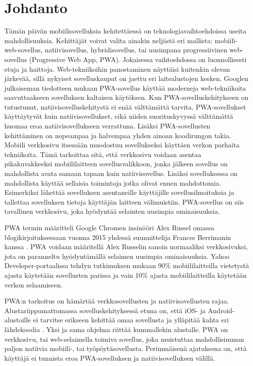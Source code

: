 \documentclass{tktltiki}
\begin{document}
\mytableofcontents

\section{Johdanto}

Tämän päivän mobiilisovelluksia kehitettäessä on teknologiavaihtoehdoissa useita mahdollisuuksia. Kehittäjät voivat valita ainakin neljästä eri mallista: mobiili-web-sovellus, natiivisovellus, hybridisovellus, tai uusimpana progressiivinen web-sovellus (Progressive Web App, PWA). Jokaisessa vaihtoehdossa on luonnollisesti etuja ja haittoja. Web-tekniikoihin panostaminen näyttäisi kuitenkin olevan järkevää, sillä nykyiset sovelluskaupat on jaettu eri laitealustojen kesken. Googlen julkaiseman tiedotteen mukaan \cite{Gambhir} PWA-sovellus käyttää moderneja web-tekniikoita saavuttaakseen sovelluksen kaltaisen käytöksen. Kun PWA-sovelluskehitykseen on tutustunut, natiivisovelluskehitystä ei enää välttämättä tarvita. PWA-sovellukset käyttäytyvät kuin natiivisovellukset, eikä niiden suorituskyvyssä välttämättä huomaa eroa natiivisovellukseen verrattuna. Lisäksi PWA-sovellusten kehittäminen on nopeampaa ja halvempaa yhden ainoan koodirungon takia. Mobiili verkkosivu itsessään muodostuu sovellukseksi käyttäen verkon parhaita tekniikoita. Tämä tarkoittaa sitä, että verkkosivu voidaan asentaa pikakuvakkeeksi mobiililaitteen sovellusvalikkoon, jonka jälkeen sovellus on mahdollista avata samaan tapaan kuin natiivisovellus. Lisäksi sovelluksessa on mahdollista käyttää sellaisia toimintoja jotka olivat ennen mahdottomia. Esimerkiksi lähettää sovelluksen asentaneille käyttäjille sovellusilmoituksia ja tallettaa sovelluksen tietoja käyttäjän laitteen välimuistiin. PWA-sovellus on siis tavallinen verkkosivu, joka hyödyntää selainten uusimpia ominaisuuksia.

PWA termin määritteli Google Chromen insinööri Alex Russel \cite{Russell, biorn2017progressive} omassa blogikirjoituksessaan vuonna 2015 yhdessä suunnittelija Frances Berrimanin kanssa \cite{tandelimpact}. PWA voidaan määritellä Alex Russelin sanoin normaaliksi verkkosivuksi, jota on paranneltu hyödyntämällä selaimen uusimpia ominaisuuksia. Yahoo Developer-portaalissa tehdyn tutkimuksen mukaan \cite{Khalaf} 90\% mobiililaitteilla vietetystä ajasta käytetään sovellusten parissa ja vain 10\% ajasta mobiililaitteilla käytetään verkon selaamiseen. 

PWA:n tarkoitus on hämärtää verkkosovellusten ja natiivisovellusten rajaa. Alustariippumattomassa sovelluskehityksessä etuna on, että iOS- ja Android-alustoille ei tarvitse erikseen kehittää omaa sovellusta ja ylläpitää kahta eri lähdekoodia \cite{xanthopoulos2013comparative}. Yksi ja sama ohjelma riittää kummallekin alustalle. PWA on verkkosivu, tai web-selaimella toimiva sovellus, joka muistuttaa mahdollisimman paljon natiivia mobiili-, tai työpöytäsovellusta. Perimmäisenä ajatuksena on, että käyttäjä ei tunnista eroa PWA-sovelluksen ja natiivisovelluksen välillä.
\end{document}
